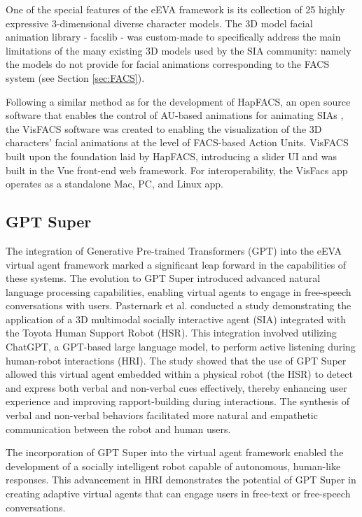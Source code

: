 \documentclass[12pt]{article}
\begin{document}
One of the special features of the eEVA framework is its collection of 25 highly expressive 3-dimensional diverse character models.  The 3D model facial animation library - facslib - was custom-made to specifically address the  main limitations of the many existing 3D models used by the SIA community: namely the models do not provide for facial animations corresponding to the FACS system (see Section \ref{sec:FACS}).

Following a similar method as for the development of HapFACS, an open source  software that enables the control of AU-based animations for animating SIAs \cite{Amini2015}, the VisFACS software was created to enabling the visualization of the 3D characters' facial animations at the level of FACS-based Action Units. 
VisFACS built upon the foundation laid by HapFACS, introducing a slider UI and was built in the Vue front-end web framework. For interoperability, the VisFacs app operates as a standalone Mac, PC, and Linux app.

\subsection{GPT Super}

The integration of Generative Pre-trained Transformers (GPT) into the eEVA virtual agent framework marked a significant leap forward in the capabilities of these systems. The evolution to GPT Super introduced advanced natural language processing capabilities, enabling virtual agents to engage in free-speech conversations with users.  Pasternark et al. \cite{Pasternak2024} conducted a study demonstrating the application of a 3D multimodal socially interactive agent (SIA) integrated with the Toyota Human Support Robot (HSR). This integration involved utilizing ChatGPT, a GPT-based large language model, to perform active listening during human-robot interactions (HRI). The study showed that the use of GPT Super allowed this virtual agent embedded within a physical robot (the HSR) to detect and express both verbal and non-verbal cues effectively, thereby enhancing user experience and improving rapport-building during interactions. The synthesis of verbal and non-verbal behaviors facilitated more natural and empathetic communication between the robot and human users.

The incorporation of GPT Super into the virtual agent framework enabled the development of a socially intelligent robot capable of autonomous, human-like responses. This advancement in HRI demonstrates the potential of GPT Super in creating adaptive virtual agents that can engage users in free-text or free-speech conversations.  
\end{document}
